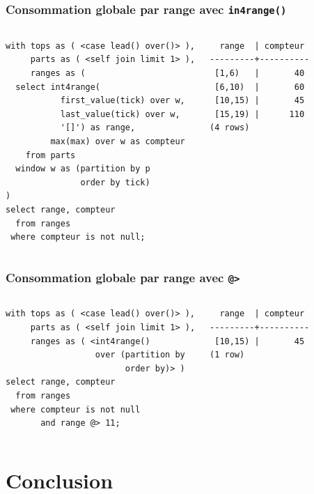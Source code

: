 \documentclass{beamer}
\begin{document}
\begin{frame}[fragile]
  \frametitle{Consommation globale par range avec \texttt{in4range()}}

\begin{columns}
\begin{verbatim}
with tops as ( <case lead() over()> ),
     parts as ( <self join limit 1> ),
     ranges as (
  select int4range(
           first_value(tick) over w,
           last_value(tick) over w,
           '[]') as range,
         max(max) over w as compteur
    from parts
  window w as (partition by p
               order by tick)
)
select range, compteur
  from ranges
 where compteur is not null;
\end{verbatim}
\begin{verbatim}
  range  | compteur 
---------+----------
 [1,6)   |       40
 [6,10)  |       60
 [10,15) |       45
 [15,19) |      110
(4 rows)
\end{verbatim}
\end{columns}
\end{frame}

\begin{frame}[fragile]
  \frametitle{Consommation globale par range avec \texttt{@>}}

\begin{columns}
\begin{verbatim}
with tops as ( <case lead() over()> ),
     parts as ( <self join limit 1> ),
     ranges as ( <int4range()
                  over (partition by
                        order by)> )
select range, compteur
  from ranges
 where compteur is not null
       and range @> 11;
\end{verbatim}

\begin{verbatim}
  range  | compteur 
---------+----------
 [10,15) |       45
(1 row)
\end{verbatim}
\end{columns}
\end{frame}


\section{Conclusion}

\end{document}

